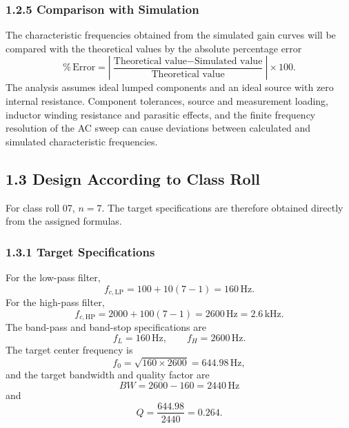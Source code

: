 \documentclass[12pt,a4paper]{article}
\begin{document}
\subsubsection*{1.2.5 Comparison with Simulation}

The characteristic frequencies obtained from the simulated gain curves will be compared with the theoretical values by the absolute percentage error
\begin{equation}
  \%\,\mathrm{Error}
  =\left|\frac{\text{Theoretical value}-\text{Simulated value}}
  {\text{Theoretical value}}\right|\times100.
  \label{eq:percentage-error}
\end{equation}
The analysis assumes ideal lumped components and an ideal source with zero internal resistance. Component tolerances, source and measurement loading, inductor winding resistance and parasitic effects, and the finite frequency resolution of the AC sweep can cause deviations between calculated and simulated characteristic frequencies.

\subsection*{1.3 Design According to Class Roll}

For class roll 07, $n=7$. The target specifications are therefore obtained directly from the assigned formulas.

\subsubsection*{1.3.1 Target Specifications}

For the low-pass filter,
\begin{equation}
  f_{c,\mathrm{LP}}=100+10(7-1)=160\,\mathrm{Hz}.
  \label{eq:target-lp}
\end{equation}
For the high-pass filter,
\begin{equation}
  f_{c,\mathrm{HP}}=2000+100(7-1)=2600\,\mathrm{Hz}
  =2.6\,\mathrm{kHz}.
  \label{eq:target-hp}
\end{equation}
The band-pass and band-stop specifications are
\begin{equation}
  f_L=160\,\mathrm{Hz},
  \qquad f_H=2600\,\mathrm{Hz}.
  \label{eq:target-band-edges}
\end{equation}
The target center frequency is
\begin{equation}
  f_0=\sqrt{160\times2600}=644.98\,\mathrm{Hz},
  \label{eq:target-f0}
\end{equation}
and the target bandwidth and quality factor are
\begin{equation}
  BW=2600-160=2440\,\mathrm{Hz}
  \label{eq:target-bw}
\end{equation}
and
\begin{equation}
  Q=\frac{644.98}{2440}=0.264.
  \label{eq:target-q}
\end{equation}
\end{document}
